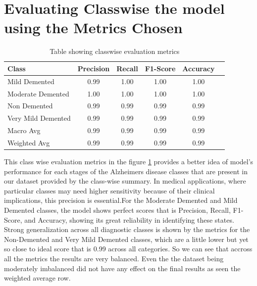\documentclass[12pt,onecolumn]{report}
\begin{document}
\section{Evaluating Classwise the model using the Metrics Chosen}
\begin{table}[h!]
    \centering
    \begin{tabular}{|l|c|c|c|c|c|}
    \hline
    \textbf{Class} & \textbf{Precision} & \textbf{Recall} & \textbf{F1-Score} & \textbf{Accuracy} \\ \hline
    Mild Demented       & 0.99 & 1.00 & 1.00 & 1.00 \\ \hline
    Moderate Demented   & 1.00 & 1.00 & 1.00 & 1.00 \\ \hline
    Non Demented        & 0.99 & 0.99 & 0.99 & 0.99 \\ \hline
    Very Mild Demented  & 0.99 & 0.99 & 0.99 & 0.99 \\ \hline
    Macro Avg           & 0.99 & 0.99 & 0.99 & 0.99 \\ \hline
    Weighted Avg        & 0.99 & 0.99 & 0.99 & 0.99 \\ \hline
    \end{tabular}
    \caption{Table showing classwise evaluation metrics}
    \label{tab:class_eval}
\end{table}
This class wise evaluation metrics in the figure \ref{tab:class_eval} provides a better idea of model's performance for each stages of the Alzheimers disease classes that are present in our dataset provided by the class-wise summary. In medical applications, where particular classes may need higher sensitivity because of their clinical implications, this precision is essential.For the Moderate Demented and Mild Demented classes, the model shows perfect scores that is Precision, Recall, F1-Score, and Accuracy, showing its great reliability in identifying these states. Strong generalization across all diagnostic classes is shown by the metrics for the Non-Demented and Very Mild Demented classes, which are a little lower but yet so close to ideal score that is 0.99 across all categories. So we can see that accross all the metrics the results are very balanced. Even the the dataset being moderately imbalanced did not have any effect on the final results as seen the weighted average row.
\end{document}

